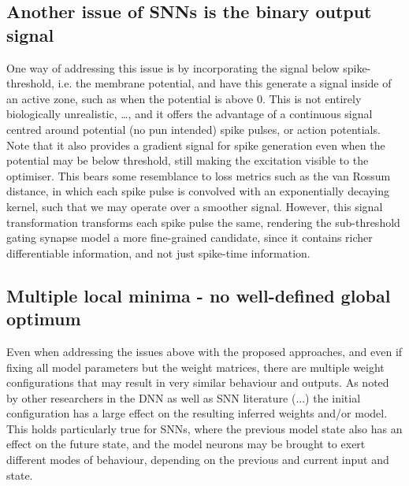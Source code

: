 \documentclass[mphil,deptreport,ai]{infthesis} %
\begin{document}
\subsection{Another issue of SNNs is the binary output signal}
One way of addressing this issue is by incorporating the signal below spike-threshold, i.e. the membrane potential, and have this generate a signal inside of an active zone, such as when the potential is above 0. This is not entirely biologically unrealistic, …, and it offers the advantage of a continuous signal centred around potential (no pun intended) spike pulses, or action potentials. Note that it also provides a gradient signal for spike generation even when the potential may be below threshold, still making the excitation visible to the optimiser.
This bears some resemblance to loss metrics such as the van Rossum distance, in which each spike pulse is convolved with an exponentially decaying kernel, such that we may operate over a smoother signal. However, this signal transformation transforms each spike pulse the same, rendering the sub-threshold gating synapse model a more fine-grained candidate, since it contains richer differentiable information, and not just spike-time information.

\subsection{Multiple local minima - no well-defined global optimum}
Even when addressing the issues above with the proposed approaches, and even if fixing all model parameters but the weight matrices, there are multiple weight configurations that may result in very similar behaviour and outputs.
As noted by other researchers in the DNN as well as SNN literature (...) the initial configuration has a large effect on the resulting inferred weights and/or model. This holds particularly true for SNNs, where the previous model state also has an effect on the future state, and the model neurons may be brought to exert different modes of behaviour, depending on the previous and current input and state.
\end{document}
